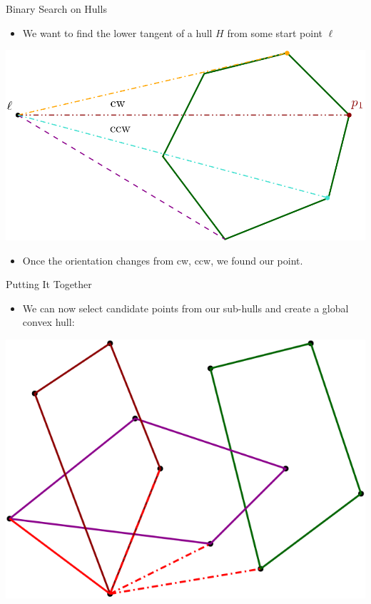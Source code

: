 \documentclass[aspectratio=169]{beamer}
\begin{document}
\begin{frame}{Binary Search on Hulls}
    \begin{itemize}
        \item We want to find the lower tangent of a hull $H$ from some start point $\ell$
    \end{itemize}
    \begin{center}
        \includegraphics[width=.6\textwidth]{binsearch.png}
    \end{center} \pause
    \begin{itemize}
        \item Once the orientation changes from cw, ccw, we found our point.
    \end{itemize}
\end{frame}

\begin{frame}{Putting It Together}
    \begin{itemize}
        \item We can now select candidate points from our sub-hulls and create a global convex hull:
    \end{itemize}
    \begin{center}
        \includegraphics[width=.6\textwidth]{hull-select.png}
    \end{center}
\end{frame}
\end{document}
